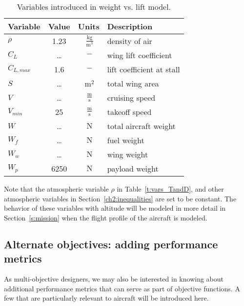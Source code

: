 \begin{footnotesize}
\begin{table}
    \centering
    \begin{tabular}{ l c c l}
        \toprule
        \textbf{Variable} & \textbf{Value} & \textbf{Units} & \textbf{Description} \\
        \midrule
        $\rho$ & 1.23 & $~\mathrm{\tfrac{kg}{m^{3}}}$ & density of air \\
        $C_L$ & \ldots & $~\mathrm{-}$ & wing lift coefficient \\
        $C_{L,max}$ & 1.6 & $~\mathrm{-}$ & lift coefficient at stall \\
        $S$ & \ldots & $~\mathrm{m^{2}}$ & total wing area \\
        $V$ & \ldots & $~\mathrm{\tfrac{m}{s}}$ & cruising speed \\
        $V_{min}$ & 25 & $~\mathrm{\tfrac{m}{s}}$ & takeoff speed \\
        $W$ & \ldots & $~\mathrm{N}$ & total aircraft weight \\
        $W_f$ & \ldots & $~\mathrm{N}$ & fuel weight \\
        $W_w$ & \ldots & $~\mathrm{N}$ & wing weight \\
        $W_p$ & 6250 & $~\mathrm{N}$ & payload weight \\
        \bottomrule
    \end{tabular}
    \caption{Variables introduced in weight vs. lift model.}
    \label{t:vars_WandL}
\end{table} \end{footnotesize}

Note that the atmospheric variable $\rho$ in Table~\ref{t:vars_TandD}, and other
atmospheric variables in Section~\ref{ch2:inequalities} are set
to be constant. The behavior of these variables with altitude
will be modeled in more detail in Section~\ref{s:mission} when
the flight profile of the aircraft is modeled.

\subsection{Alternate objectives: adding performance metrics}
\label{s:altobj}

As multi-objective designers, we may also be interested in knowing about
additional performance metrics that can serve as part of objective functions. A
few that are particularly relevant to aircraft will be introduced here.

